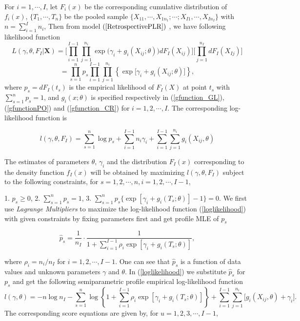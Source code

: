 \documentclass[12]{interact}
\theoremstyle{plain}%
\theoremstyle{definition}
\theoremstyle{remark}
\begin{document}
For $i =  1, \cdots, I$, let $F_i(x)$ be the corresponding cumulative distribution of $f_i(x)$, $\{T_1, \cdots,
T_n \}$ be the pooled sample $\{X_{11}, \cdots, X_{1n_1};\cdots; X_{I1}, \cdots, X_{In_I}\}$ with $n=\sum_{i=1}^In_i$, Then from model $(\ref{RetrospectivePLR})$ , we have following likelihood function
$$ L(\gamma, \theta, F_I|\mathbf{X})=\Big[\prod_{i=1}^{I-1} \prod_{j=1}^{n_i}
\exp\Big(\gamma_i+g_i(X_{ij};\theta)\Big)dF_I(X_{ij}) \Big]\Big[\prod_{j=1}^{n_I} dF_I(X_{Ij})\Big] $$
\begin{equation}
	=\prod_{s=1}^n p_s \prod_{i=1}^{I-1} \prod_{j=1}^{n_i}\left\{\exp\Big[ \gamma_i+g_i(X_{ij};\theta )\Big]\right\},
	\label{lik}
\end{equation}
where $p_s=dF_I(t_s)$ is the empirical likelihood of $F_I(X)$ at point $t_s$ with $\sum_{s=1}^n p_s=1$, and $g_i(x;\theta)$ is specified respectively in (\ref{gfunction_GL}), (\ref{gfunctionPO}) and (\ref{gfunction_CR}) for $i=1, 2,\cdots, I$. The corresponding log-likelihood function is

\begin{equation}
	l(\gamma,\theta, F_I) =\sum_{s=1}^n \log p_s + \sum_{i=1}^{I-1}n_i\gamma_i+ \sum_{i=1}^{I-1}\sum_{j=1}^{n_i}
	g_i(X_{ij},\theta)  \label{loglikelihood}
\end{equation}

The estimates of parameters $\theta$, $\gamma_i$ and the distribution $F_I(x)$ corresponding to the density function
$f_I(x)$ will be obtained  by maximizing $l(\gamma, \theta, F_I)$ subject to the following constraints, for $s=1, 2, \cdots, n, i =1, 2, \cdots, I-1$,

1.\hspace{3mm} $p_s \ge 0$, \hspace{3mm} 2.\hspace{3mm} $\sum_{s=1}^n p_s=1$,\hspace{3mm} 3.\hspace{3mm} $\sum_{s=1}^n p_s\big\{\exp[\gamma_i+g_i(T_s;\theta)]-1 \big\}=0$.
We first use {\em Lagrange Multipliers} to maximize the log-likelihood function (\ref{loglikelihood}) with given constraints by fixing parameters first and get profile MLE of $p_s$

\begin{equation}
	\hat{p}_s=\frac{1}{n_I}\cdot\frac{1}{1+\sum_{i=1}^{I-1}\rho_i\exp[\gamma_i+ g_i(T_s;\theta)]},\label{p_mle}
\end{equation}

where $\rho_i=n_i/n_I$ for $i=1,2, \cdots, I-1$. One can see that $\hat{p}_s$ is a function of data values and unknown parameters $\gamma$ and $\theta$. In (\ref{loglikelihood}) we substitute $\hat{p}_s$ for $p_s$ and get the following semiparametric profile empirical log-likelihood function
$$l(\gamma,\theta)=-n\log n_I-\sum_{s=1}^n\log\left\{1+\sum_{i=1}^{I-1}\rho_i\exp[\gamma_i+
g_i(T_s; \theta)]\right\}+\sum_{i=1}^{I-1}\sum_{j=1}^{n_i}\Big[  g_i(X_{ij}, \theta) + \gamma_i \Big]. \label{parloglik}
$$
The corresponding score equations are given by, for $u=1, 2, 3,\cdots, I-1$,
\end{document}
